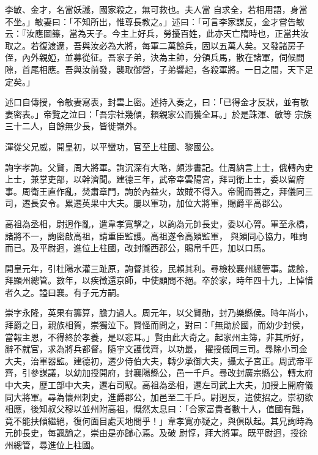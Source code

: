 \begin{pinyinscope}
 李敏、金才，名當妖讖，國家殺之，無可救也。夫人當
 自求全，若相用語，身當不坐。」敏妻曰：「不知所出，惟尊長教之。」述曰：「可言李家謀反，金才嘗告敏云：『汝應圖籙，當為天子。今主上好兵，勞擾百姓，此亦天亡隋時也，正當共汝取之。若復渡遼，吾與汝必為大將，每軍二萬餘兵，固以五萬人矣。又發諸房子侄，內外親婭，並募從征。吾家子弟，決為主帥，分領兵馬，散在諸軍，伺候間隙，首尾相應。吾與汝前發，襲取御營，子弟響起，各殺軍將。一日之間，天下足定矣。」



 述口自傳授，令敏妻寫表，封雲上密。述持入奏之，曰：「已得金才反狀，並有敏妻密表。」帝覽之泣曰：「吾宗社幾傾，賴親家公而獲全耳。」於是誅渾、敏等
 宗族三十二人，自餘無少長，皆徙嶺外。



 渾從父兄威，開皇初，以平蠻功，官至上柱國、黎國公。



 詢字孝詢。父賢，周大將軍。詢沉深有大略，頗涉書記。仕周納言上士，俄轉內史上士，兼掌吏部，以幹濟聞。建德三年，武帝幸雲陽宮，拜司衛上士，委以留府事。周衛王直作亂，焚肅章門，詢於內益火，故賊不得入。帝聞而善之，拜儀同三司，遷長安令。累遷英果中大夫。屢以軍功，加位大將軍，賜爵平高郡公。



 高祖為丞相，尉迥作亂，遣韋孝寬擊之，以詢為元帥長史，委以心膂。軍至永橋，諸將不一，詢密啟高祖，請重臣監護。高祖遂令高熲監軍，
 與熲同心協力，唯詢而已。及平尉迥，進位上柱國，改封隴西郡公，賜帛千匹，加以口馬。



 開皇元年，引杜陽水灌三趾原，詢督其役，民賴其利。尋檢校襄州總管事。歲餘，拜顯州總管。數年，以疾徵還京師，中使顧問不絕。卒於家，時年四十九，上悼惜者久之。謚曰襄。有子元方嗣。



 崇字永隆，英果有籌算，膽力過人。周元年，以父賢勛，封乃樂縣侯。時年尚小，拜爵之日，親族相賀，崇獨泣下。賢怪而問之，對曰：「無勛於國，而幼少封侯，當報主恩，不得終於孝養，是以悲耳。」賢由此大奇之。起家州主簿，非其所好，辭不就官，求為將兵都督。隨宇文護伐齊，以功最，
 擢授儀同三司。尋除小司金大夫，治軍器監。建德初，遷少侍伯大夫，轉少承御大夫，攝太子宮正。周武帝平齊，引參謀議，以幼加授開府，封襄陽縣公，邑一千戶。尋改封廣宗縣公，轉太府中大夫，歷工部中大夫，遷右司馭。高祖為丞相，遷左司武上大夫，加授上開府儀同大將軍。尋為懷州刺史，進爵郡公，加邑至二千戶。尉迥反，遣使招之。崇初欲相應，後知叔父穆以並州附高祖，慨然太息曰：「合家富貴者數十人，值國有難，竟不能扶傾繼絕，復何面目處天地間乎！」韋孝寬亦疑之，與俱臥起。其兄詢時為元帥長史，每諷諭之，崇由是亦歸心焉。及破
 尉惇，拜大將軍。既平尉迥，授徐州總管，尋進位上柱國。




\end{pinyinscope}
